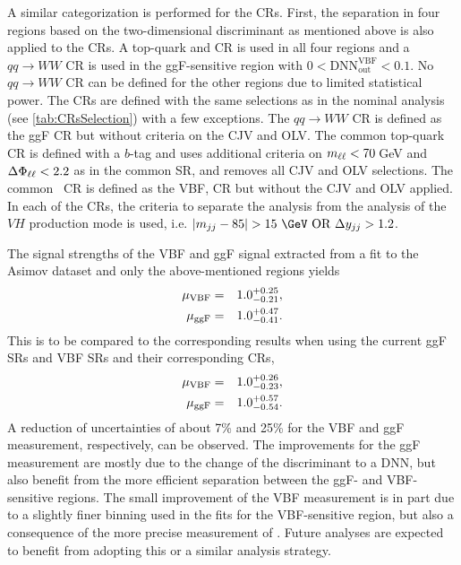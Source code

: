     A similar categorization is performed for the CRs.
    First, the separation in four regions based on the two-dimensional discriminant as mentioned above is also applied to the CRs. A top-quark and \Ztautau CR is used in all four regions and a $qq \to WW$ CR is used in the ggF-sensitive region with $0 < \text{DNN}_\mathrm{out}^\mathrm{VBF} < 0.1$. No $qq \to WW$ CR can be defined for the other regions due to limited statistical power.
    The CRs are defined with the same selections as in the nominal analysis (see \cref{tab:CRsSelection}) with a few exceptions.
    The $qq \to WW$ CR is defined as the ggF \TwoJet CR but without criteria on the CJV and OLV.
    The common top-quark CR is defined with a $b$-tag and uses additional criteria on $m_{\ell\ell} < 70\,$GeV and $\Delta\Phi_{\ell\ell} < 2.2$ as in the common \TwoJet SR, and removes all CJV and OLV selections. The common \Ztautau\ CR is defined as the VBF, \Ztautau CR but without the CJV and OLV applied.
    In each of the CRs, the criteria to separate the analysis from the analysis of the $VH$ production mode is used, i.e. $|\mjj-85| > 15~\GeV \text{ OR } \dyjj > 1.2$.

The signal strengths of the VBF and ggF signal extracted from a fit to the Asimov dataset and only the above-mentioned \TwoJet regions yields
\begin{eqnarray*}
    \mu_{\mathrm{VBF}} &=& 1.0^{+0.25}_{-0.21}, \\
    \mu_{\mathrm{ggF}} &=& 1.0^{+0.47}_{-0.41}.
\end{eqnarray*}
This is to be compared to the corresponding results when using the current ggF \TwoJet SRs and VBF \TwoJet SRs and their corresponding CRs,
\begin{eqnarray*}
    \mu_{\mathrm{VBF}} &=& 1.0^{+0.26}_{-0.23}, \\
    \mu_{\mathrm{ggF}} &=& 1.0^{+0.57}_{-0.54}.
\end{eqnarray*}
A reduction of uncertainties of about 7\% and 25\% for the VBF and ggF measurement, respectively, can be observed.
The improvements for the ggF measurement are mostly due to the change of the discriminant to a DNN, but also benefit from the more efficient separation between the ggF- and VBF-sensitive regions.
The small improvement of the VBF measurement is in part due to a slightly finer binning used in the fits for the VBF-sensitive region, but also a consequence of the more precise measurement of \muGGF.
Future analyses are expected to benefit from adopting this or a similar analysis strategy.

